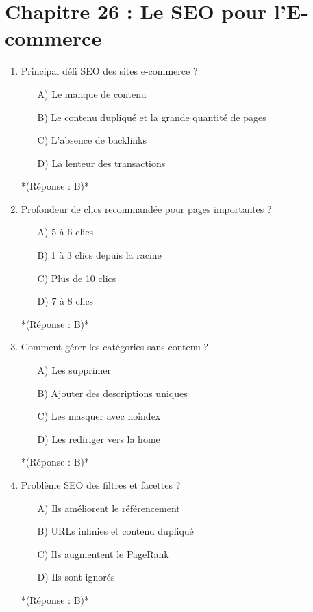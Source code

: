 \documentclass[12pt,a4paper,twoside]{report}
\begin{document}
\section*{Chapitre 26 : Le SEO pour l'E-commerce}

\begin{enumerate}
\item Principal défi SEO des sites e-commerce ?
\begin{itemize}
\item[A)] Le manque de contenu
\item[B)] Le contenu dupliqué et la grande quantité de pages
\item[C)] L'absence de backlinks
\item[D)] La lenteur des transactions
\end{itemize}
*(Réponse : B)*

\item Profondeur de clics recommandée pour pages importantes ?
\begin{itemize}
\item[A)] 5 à 6 clics
\item[B)] 1 à 3 clics depuis la racine
\item[C)] Plus de 10 clics
\item[D)] 7 à 8 clics
\end{itemize}
*(Réponse : B)*

\item Comment gérer les catégories sans contenu ?
\begin{itemize}
\item[A)] Les supprimer
\item[B)] Ajouter des descriptions uniques
\item[C)] Les masquer avec noindex
\item[D)] Les rediriger vers la home
\end{itemize}
*(Réponse : B)*

\item Problème SEO des filtres et facettes ?
\begin{itemize}
\item[A)] Ils améliorent le référencement
\item[B)] URLs infinies et contenu dupliqué
\item[C)] Ils augmentent le PageRank
\item[D)] Ils sont ignorés
\end{itemize}
*(Réponse : B)*


\end{enumerate}
\end{document}
